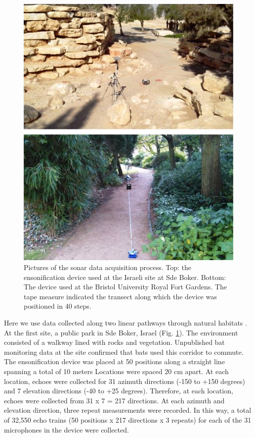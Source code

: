 \documentclass[preprint,5p]{elsarticle}
\begin{document}
\begin{figure}[tb]
	\centering
	\includegraphics[width=1\linewidth]{figures/datacollection}
	\caption{Pictures of the sonar data acquisition process. Top: the ensonification device used at the Israeli site at Sde Boker. Bottom: The device used at the Bristol University Royal Fort Gardens. The tape measure indicated the transect along which the device was positioned in 40 steps.}
	\label{fig:datacollection}
\end{figure}

Here we use data collected along two linear pathways through natural habitats \citep{Vanderelst2016}. At the first site, a public park in Sde Boker, Israel (Fig. \ref{fig:datacollection}). The environment consisted of a walkway lined with rocks and vegetation. Unpublished bat monitoring data at the site confirmed that bats used this corridor to commute. The ensonification device was placed at 50 positions along a straight line spanning a total of 10 meters Locations were spaced 20 cm apart. At each location, echoes were collected for 31 azimuth directions (-150 to +150 degrees) and 7 elevation directions (-40 to +25 degrees). Therefore, at each location, echoes were collected from 31 x 7 = 217 directions. At each azimuth and elevation direction, three repeat measurements were recorded. In this way, a total of 32,550 echo trains (50 positions x 217 directions x 3 repeats) for each of the 31 microphones in the device were collected.
\end{document}
